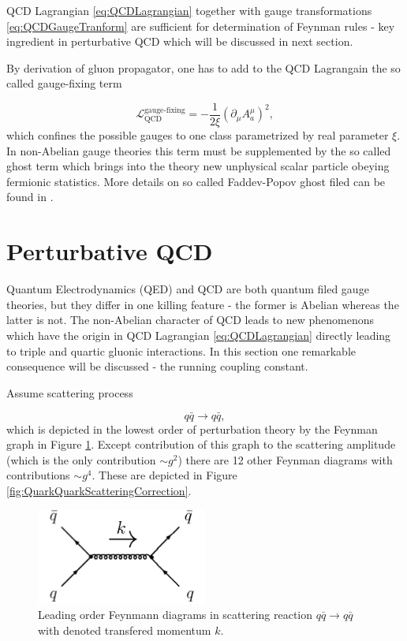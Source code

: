 QCD Lagrangian \eqref{eq:QCDLagrangian} together with gauge transformations
\eqref{eq:QCDGaugeTranform} are sufficient for determination of Feynman rules -
key ingredient in perturbative QCD which will be discussed in next section.

By derivation of gluon propagator, one has to add to the QCD Lagrangain the so
called gauge-fixing term

\begin{equation}
  \mathscr{L}_{\text{QCD}}^{\text{gauge-fixing}} = - \frac{1}{2\xi} \left( \partial_\mu A_a^\mu
  \right)^2,
  \label{eq:QCDGaugeFixingTerm}
\end{equation}
which confines the possible gauges to one class parametrized by real parameter
$\xi$. In non-Abelian gauge theories this term must be supplemented by the so
called ghost term which brings into the theory new unphysical scalar particle
obeying fermionic statistics. More details on so called Faddev-Popov ghost filed
can be found in \cite{FaddeevPopovGhosts}.


\section{Perturbative QCD}

Quantum Electrodynamics (QED) and QCD are both quantum filed gauge theories, but
they differ in one killing feature - the former is Abelian whereas the latter is
not. The non-Abelian character of QCD leads to new phenomenons which have the origin in QCD
Lagrangian \eqref{eq:QCDLagrangian} directly leading to triple and quartic
gluonic interactions. In this section one remarkable consequence will be
discussed - the running coupling constant.

Assume scattering process  

\begin{equation}
  q \bar{q} \rightarrow q \bar{q},
  \label{eq:QuarkScattering}
\end{equation}
which is depicted in the lowest order of perturbation theory by the Feynman
graph in Figure \ref{fig:QuarkQuarkScattering}. Except contribution of this
graph to the scattering amplitude (which is the only contribution $\sim g^2$)
there are 12 other Feynman diagrams with contributions $\sim g^4$. These are
depicted in Figure \ref{fig:QuarkQuarkScatteringCorrection}. 

\begin{figure}
  \centering
  \includegraphics[width=0.5\textwidth]{Chapter1/QuarkQuarkScattering.png} 
  \caption{Leading order Feynmann diagrams in scattering reaction $q \bar{q}
    \rightarrow q \bar{q}$ with denoted transfered momentum $k$.}
  \label{fig:QuarkQuarkScattering}
\end{figure}

